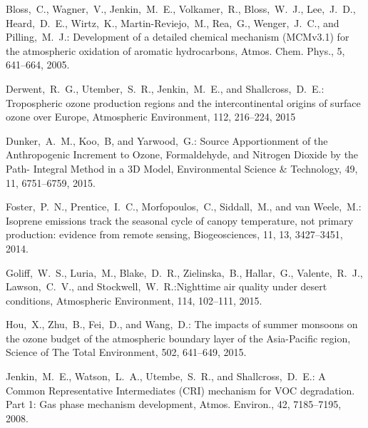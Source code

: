 \documentclass{article}
\begin{document}
\begin{thebibliography}{17}
     Bloss,~C., Wagner,~V., Jenkin,~M.~E., Volkamer,~R., Bloss,~W.~J., Lee,~J.~D., Heard,~D.~E., Wirtz,~K., Martin-Reviejo,~M., Rea,~G., Wenger,~J.~C., and Pilling,~M.~J.: Development of a detailed chemical mechanism (MCMv3.1) for the atmospheric oxidation of aromatic hydrocarbons, Atmos. Chem. Phys., 5, 641--664, 2005.

     Derwent,~R.~G., Utember,~S.~R., Jenkin,~M.~E., and Shallcross,~D.~E.: Tropospheric ozone production regions and the intercontinental origins of surface ozone over Europe, Atmospheric Environment, 112, 216--224, 2015

     Dunker,~A.~M., Koo,~B, and Yarwood,~G.: Source Apportionment of the Anthropogenic Increment to Ozone, Formaldehyde, and Nitrogen Dioxide by the Path- Integral Method in a 3D Model, Environmental Science \& Technology, 49, 11, 6751--6759, 2015.

    Foster,~P.~N., Prentice,~I.~C., Morfopoulos,~C., Siddall,~M., and van Weele,~M.: Isoprene emissions track the seasonal cycle of canopy temperature, not primary production: evidence from remote sensing, Biogeosciences, 11, 13, 3427--3451, 2014.

     Goliff,~W.~S., Luria,~M., Blake,~D.~R., Zielinska,~B., Hallar,~G., Valente,~R.~J., Lawson,~C.~V., and Stockwell,~W.~R.:Nighttime air quality under desert conditions, Atmospheric Environment, 114, 102--111, 2015.

     Hou,~X., Zhu,~B., Fei,~D., and Wang,~D.: The impacts of summer monsoons on the ozone budget of the atmospheric boundary layer of the Asia-Pacific region, Science of The Total Environment, 502, 641--649, 2015.

     Jenkin,~M.~E., Watson,~L.~A., Utembe,~S.~R., and Shallcross,~D.~E.: {A Common Representative Intermediates (CRI) mechanism for VOC degradation. Part 1: Gas phase mechanism development}, Atmos. Environ., 42, 7185--7195, 2008.


\end{thebibliography}
\end{document}
